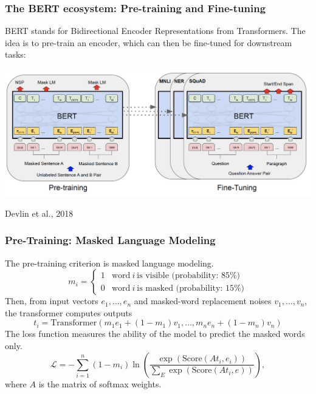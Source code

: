\documentclass{beamer}
\begin{document}
\begin{frame}
  \frametitle{The BERT ecosystem: Pre-training and Fine-tuning}

  BERT stands for Bidirectional Encoder Representations from
  Transformers.  The idea is to pre-train an encoder, which can then
  be fine-tuned for downstream tasks:
  \centerline{\includegraphics[width=\textwidth]{figs/devlin2018fig1.png}}
  \centerline{\tiny Devlin et al., 2018}
\end{frame}

\begin{frame}
  \frametitle{Pre-Training: Masked Language Modeling}

  The pre-training criterion is masked language modeling.
  \begin{displaymath}
    m_i = \left\{\begin{array}{ll}
    1 & \text{word}~i~\text{is visible (probability: 85\%)}\\
    0 & \text{word}~i~\text{is masked (probability: 15\%)}
    \end{array}\right.
  \end{displaymath}
  Then, from input vectors $e_1,\ldots, e_n$ and masked-word
  replacement noises $v_1,\ldots, v_n$, the transformer computes
  outputs
  \begin{displaymath}
    t_i = \text{Transformer}\left(m_1e_1+(1-m_1)v_1,\ldots,m_ne_n+(1-m_n)v_n\right)
  \end{displaymath}
  The loss function measures the ability of the model to predict the
  masked words only.
  \begin{displaymath}
    {\mathcal L}=-\sum_{i=1}^n (1-m_i)\ln
    \left(\frac{\exp\left(\text{Score}(At_i,e_i)\right)}{\sum_E\exp\left(\text{Score}(At_i,e)\right)}
    \right),
  \end{displaymath}
  where $A$ is the matrix of softmax weights.
\end{frame}
\end{document}
